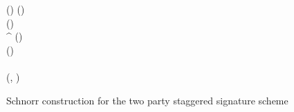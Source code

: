 \begin{figure}[tb]
\begin{center}
{\begin{varwidth}{\textwidth}
{            \varSchnorrChallenge \opAssign \funHash{\varMsg \opConc \varRand \opConc \varPubKey} \< \< \varSchnorrChallenge \opAssign \funHash{\varMsg \opConc \varRand \opConc \varPubKey} \\
            \varSAlice \opAssign \varNonceAlice \opAddScalar \varSecKeyAlice \opTimesScalar \varSchnorrChallenge \< \< \varSBob \opAssign \varNonceBob \opAddScalar \varSecKeyBob \opTimesScalar \varSchnorrChallenge \\
            \varSigAlice \opAssign (\varSAlice \opSeperate \varSchnorrChallenge \opSeperate \varRandAlice ) \< \< \varSigBob \opAssign (\varSBob \opSeperate \varSchnorrChallenge \opSeperate \varRandBob) \\
            \pcreturn \varSigAlice \< \< \pcreturn \varSigBob 
            } 
            \procedure[linenumbering]{$\procVerfPtSig{\varSig}{\varMsg}{\varPubKeyOneSide}{}$} {
            (\varSOneSide \opSeperate \varSchnorrChallenge \opSeperate \varRandOneSide) \opFunResult \varSig \\
            \pcreturn \funGen{\varSOneSide} \opEq \varRandOneSide \opAddPoint \varPubKeyOneSide^{\varSchnorrChallenge}
            }
            \procedure[linenumbering]{$\procFinSig{\varSigAlice}{\varSigBob}$} {
            (\varSAlice \opSeperate \varSchnorrChallenge \opSeperate \varRandAlice) \opFunResult \varSigAlice \\
            (\varSBob \opSeperate \varSchnorrChallenge \opSeperate \varRandBob) \opFunResult \varSigBob \\
            \varS \opAssign \varSAlice \opAddScalar \varSBob \\
            \varSigFin \opAssign (\varS, \varSchnorrChallenge) \\
            \pcreturn \varSigFin
            }
        \end{varwidth}
        }
    \end{center}
    \caption{Schnorr construction for the two party staggered signature scheme}
    \label{fig:twoparty-schnorr}
\end{figure}


